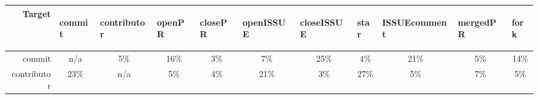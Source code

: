 \documentclass[smallextended]{svjour3}
\begin{document}
\begin{table}[!b]
\centering

\begin{adjustbox}{max width=0.96\textwidth}
\begin{tabular}{r|cccccccccc}
\rowcolor[HTML]{FFFFFF}
{\color[HTML]{000000} Target } & \multicolumn{1}{l}{{\color[HTML]{000000} \begin{sideways}commit\end{sideways}}} & \multicolumn{1}{l}{{\color[HTML]{000000} \begin{sideways}contributor\end{sideways}}} & \multicolumn{1}{l}{{\color[HTML]{000000} \begin{sideways}openPR\end{sideways}}} & \multicolumn{1}{l}{{\color[HTML]{000000} \begin{sideways}closePR\end{sideways}}} & \multicolumn{1}{l}{{\color[HTML]{000000} \begin{sideways}openISSUE\end{sideways}}} & \multicolumn{1}{l}{{\color[HTML]{000000} \begin{sideways}closeISSUE\end{sideways}}} & \multicolumn{1}{l}{{\color[HTML]{000000} \begin{sideways}star\end{sideways}}} & \multicolumn{1}{l}{{\color[HTML]{000000} \begin{sideways}ISSUEcomment\end{sideways}}} & \multicolumn{1}{l}{{\color[HTML]{000000} \begin{sideways}mergedPR\end{sideways}}} & \multicolumn{1}{l}{{\color[HTML]{000000} \begin{sideways}fork\end{sideways}}} \\ \hline
\cellcolor[HTML]{FFFFFF}commit      & \cellcolor[HTML]{F4CCCC}n/a  & \cellcolor[HTML]{DEDEDE}5\%  & \cellcolor[HTML]{B3B3B3}16\% & \cellcolor[HTML]{EFEFEF}3\%  & \cellcolor[HTML]{DEDEDE}7\%  & \cellcolor[HTML]{A7A7A7}25\%                         & \cellcolor[HTML]{E7E7E7}4\%  & \cellcolor[HTML]{A5A5A5}21\% & \cellcolor[HTML]{DEDEDE}5\%  & \cellcolor[HTML]{B9B9B9}14\% \\
contributor & \cellcolor[HTML]{A3A3A3}23\% & \cellcolor[HTML]{F4CCCC}n/a  & \cellcolor[HTML]{CCCCCC}5\%  & \cellcolor[HTML]{DEDEDE}4\%  & \cellcolor[HTML]{A7A7A7}21\% & \cellcolor[HTML]{EFEFEF}3\%  & \cellcolor[HTML]{999999}27\% & \cellcolor[HTML]{CCCCCC}5\%  & \cellcolor[HTML]{C8C8C8}7\%  & \cellcolor[HTML]{CCCCCC}5\%  \\

\end{tabular}
\end{adjustbox}
\end{table}
\end{document}
